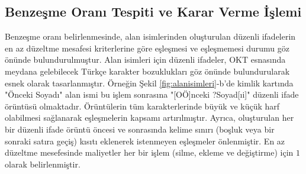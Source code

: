 \documentclass[conference, a4paper]{IEEEtran}
\begin{document}
\subsection{Benzeşme Oranı Tespiti ve Karar Verme İşlemi}
Benzeşme oranı belirlenmesinde, alan isimlerinden oluşturulan düzenli ifadelerin en az düzeltme mesafesi kriterlerine
göre eşleşmesi ve eşleşmemesi durumu göz önünde bulundurulmuştur. Alan isimleri için düzenli ifadeler, OKT esnasında
meydana gelebilecek Türkçe karakter bozuklukları göz önünde bulundurularak esnek olarak tasarlanmıştır. Örneğin Şekil
\ref{fig:alanisimleri}-b'de kimlik kartında "Önceki Soyadı" alan ismi bu işlem sonrasına "[OÖ]nceki ?Soyad[ıi]" düzenli
ifade örüntüsü olmaktadır. Örüntülerin tüm karakterlerinde büyük ve küçük harf olabilmesi sağlanarak eşleşmelerin
kapsamı artırılmıştır. Ayrıca, oluşturulan her bir düzenli ifade örüntü öncesi ve sonrasında kelime sınırı (boşluk veya
bir sonraki satıra geçiş) kısıtı eklenerek istenmeyen eşleşmeler önlenmiştir. En az düzeltme mesefesinde maliyetler her
bir işlem (silme, ekleme ve değiştirme) için $1$ olarak belirlenmiştir.
\end{document}
